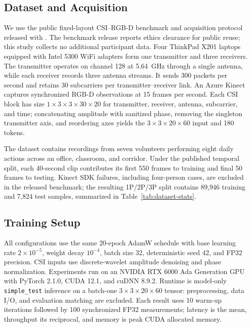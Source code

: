 \documentclass[conference,onecolumn]{IEEEtran}
\begin{document}
\subsection{Dataset and Acquisition}
\label{sec:dataset-acquisition}
We use the public fixed-layout CSI--RGB-D benchmark and acquisition protocol released with \cite{yan2024personwifi3d}. The benchmark release reports ethics clearance for public reuse; this study collects no additional participant data. Four ThinkPad X201 laptops equipped with Intel 5300 WiFi adapters form one transmitter and three receivers. The transmitter operates on channel 128 at 5.64~GHz through a single antenna, while each receiver records three antenna streams. It sends 300 packets per second and retains 30 subcarriers per transmitter--receiver link. An Azure Kinect captures synchronized RGB-D observations at 15 frames per second. Each CSI block has size $1 \times 3 \times 3 \times 30 \times 20$ for transmitter, receiver, antenna, subcarrier, and time; concatenating amplitude with sanitized phase, removing the singleton transmitter axis, and reordering axes yields the $3 \times 3 \times 20 \times 60$ input and 180 tokens.

The dataset contains recordings from seven volunteers performing eight daily actions across an office, classroom, and corridor. Under the published temporal split, each 40-second clip contributes its first 550 frames to training and final 50 frames to testing. Kinect SDK failures, including four-person cases, are excluded in the released benchmark; the resulting 1P/2P/3P split contains 89{,}946 training and 7{,}824 test samples, summarized in Table~\ref{tab:dataset-stats}.



\subsection{Training Setup}
\label{sec:training-setup}
All configurations use the same 20-epoch AdamW schedule with base learning rate $2{\times}10^{-5}$, weight decay $10^{-4}$, batch size 32, deterministic seed 42, and FP32 precision. CSI inputs use discrete-wavelet amplitude denoising and phase normalization. Experiments run on an NVIDIA RTX 6000 Ada Generation GPU with PyTorch 2.1.0, CUDA 12.1, and cuDNN 8.9.2. Runtime is model-only \texttt{simple\_test} inference on a batch-one $3 \times 3 \times 20 \times 60$ tensor: preprocessing, data I/O, and evaluation matching are excluded. Each result uses 10 warm-up iterations followed by 100 synchronized FP32 measurements; latency is the mean, throughput its reciprocal, and memory is peak CUDA allocated memory.
\end{document}
